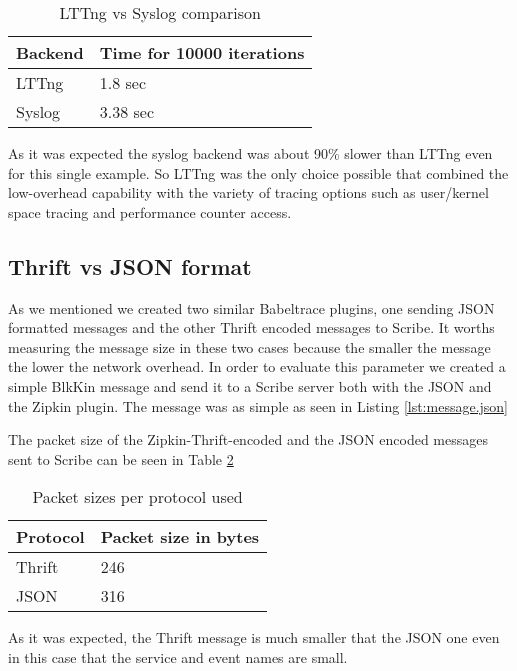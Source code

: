\begin{table}[H]
    \centering
    \begin{tabular}{ | l | l | }
        \hline
        Backend & Time for 10000 iterations \\ \hline \hline
        LTTng &  1.8 sec \\ \hline
        Syslog & 3.38 sec \\ \hline
    \end{tabular}
    \caption{LTTng vs Syslog comparison}
    \label{tab:lttng-syslog}
\end{table}

As it was expected the syslog backend was about 90\% slower than LTTng even for
this single example. So LTTng was the only choice possible that combined the
low-overhead capability with the variety of tracing options such as user/kernel
space tracing and performance counter access.

\subsection{Thrift vs JSON format}
As we mentioned we created two similar Babeltrace plugins, one sending JSON
formatted messages and the other Thrift encoded messages to Scribe. It worths
measuring the message size in these two cases because the smaller the message
the lower the network overhead.
In order to evaluate this parameter we created a simple BlkKin message and send
it to a Scribe server both with the JSON and the Zipkin plugin. The message was
as simple as seen in Listing \ref{lst:message.json}


The packet size of the Zipkin-Thrift-encoded and the JSON encoded messages sent
to Scribe can be seen in Table \ref{tab:payloads}

\begin{table}[H]
    \centering
    \begin{tabular}{ | l | l | }
        \hline
        Protocol & Packet size in bytes \\ \hline \hline
        Thrift & 246 \\ \hline
        JSON  & 316 \\ \hline
    \end{tabular}
    \caption{Packet sizes per protocol used}
    \label{tab:payloads}
\end{table}

As it was expected, the Thrift message is much smaller that the JSON one even in
this case that the service and event names are small.

